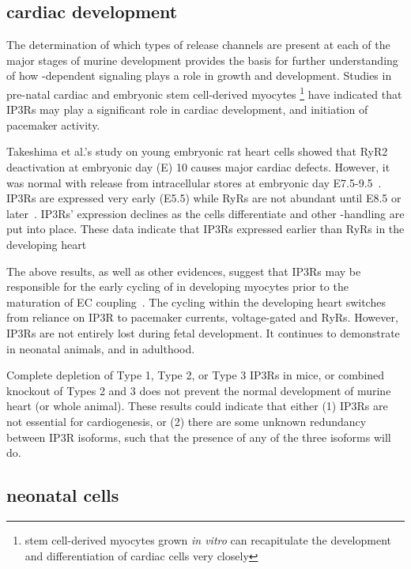 \subsection{cardiac development}
\label{sec:cardiac-development}

The determination of which types of  release channels are
present at each of the major stages of murine development provides the
basis for further understanding of how -dependent signaling
plays a role in growth and development.  Studies in pre-natal cardiac
and embryonic stem cell-derived myocytes
\footnote{stem cell-derived myocytes grown {\it in vitro} can
  recapitulate the development and differentiation of cardiac cells
  very closely}
have indicated that IP3Rs may play a significant role in cardiac
development, and initiation of pacemaker activity. 

Takeshima et al.'s study on young embryonic rat heart cells showed
that RyR2 deactivation at embryonic day (E) 10 causes major cardiac
defects. However, it was normal with  release from
intracellular stores at embryonic day
E7.5-9.5~\citep{takeshima1998ela}.  IP3Rs are expressed very early
(E5.5) while RyRs are not abundant until E8.5 or
later~\citep{rosemblit1999icr}.  IP3Rs' expression declines as the
cells differentiate and other -handling are put into place.
These data indicate that IP3Rs expressed earlier than RyRs in the
developing heart 


The above results, as well as other evidences, suggest that IP3Rs may
be responsible for the early cycling of  in developing
myocytes prior to the maturation of EC
coupling~\citep{kockskamper2008ip3}.  The  cycling within the
developing heart switches from reliance on IP3R to pacemaker currents,
voltage-gated  and RyRs. However, IP3Rs are not entirely
lost during fetal development. It continues to demonstrate in neonatal
animals, and in adulthood.


Complete depletion of Type 1, Type 2, or Type 3 IP3Rs in mice, or
combined knockout of Types 2 and 3 does not prevent the normal
development of murine heart (or whole animal). These results could
indicate that either (1) IP3Rs are not essential for cardiogenesis, or
(2) there are some unknown redundancy between IP3R isoforms, such that
the presence of any of the three isoforms will do. 


\subsection{neonatal cells}
\label{sec:neonatal-cells}

